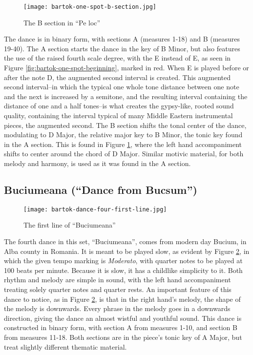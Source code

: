 \begin{figure}
  \centering
  \texttt{[image: bartok-one-spot-b-section.jpg]}
  \caption[The B section of ``Pe loc'', of Bartok's \textit{Romanian Folk Dances, Sz. 56, BB 68}]{The B section in ``Pe loc''}
  \label{fig:bartok-one-spot-b-section}
\end{figure}

The dance is in binary form, with sections A (measures 1-18) and B (measures 19-40). The A section starts the dance in the key of B Minor, but also features the use of the raised fourth scale degree, with the E\musSharp{} instead of E, as seen in Figure \ref{fig:bartok-one-spot-beginning}\autocite{Lung_2016}, marked in red. When E\musSharp{} is played before or after the note D, the augmented second interval is created. This augmented second interval--in which the typical one whole tone distance between one note and the next is increased by a semitone, and the resulting interval containing the distance of one and a half tones--is what creates the gypsy-like, rooted sound quality, containing the interval typical of many Middle Eastern instrumental pieces, the augmented second. The B section shifts the tonal center of the dance, modulating to D Major, the relative major key to B Minor, the tonic key found in the A section. This is found in Figure \ref{fig:bartok-one-spot-b-section}\autocite{Lung_2016}, where the left hand accompaniment shifts to center around the chord of D Major. Similar motivic material, for both melody and harmony, is used as it was found in the A section.

\subsection{Buciumeana (``Dance from Bucsum'')}

\begin{figure}
  \centering
  \texttt{[image: bartok-dance-four-first-line.jpg]}
  \caption[The first line of ``Buciumeana'' of Bartok's \textit{Romanian Folk Dances}, Sz. 56, BB 68]{The first line of ``Buciumeana''}
  \label{fig:bartok-dance-four-first-line}
\end{figure}


The fourth dance in this set, ``Buciumeana'', comes from modern day Bucium, in Alba county in Romania. It is meant to be played slow, as evident by Figure \ref{fig:bartok-dance-four-first-line}\autocite{Lung_2016}, in which the given tempo marking is \textit{Moderato}, with quarter notes to be played at 100 beats per minute. Because it is slow, it has a childlike simplicity to it. Both rhythm and melody are simple in sound, with the left hand accompaniment treating solely quarter notes and quarter rests. An important feature of this dance to notice, as in Figure \ref{fig:bartok-dance-four-first-line}\autocite{Lung_2016}, is that in the right hand's melody, the shape of the melody is downwards. Every phrase in the melody goes in a downwards direction, giving the dance an almost wistful and youthful sound. This dance is constructed in binary form, with section A from measures 1-10, and section B from measures 11-18. Both sections are in the piece's tonic key of A Major, but treat slightly different thematic material. 

